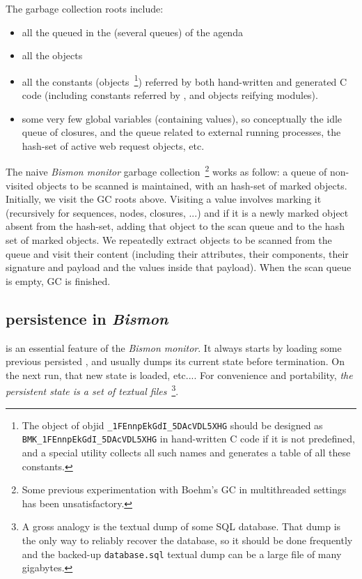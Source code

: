 The garbage collection roots include:

\begin{itemize}
\item all the  queued in the (several queues) of the agenda
\item all the  objects
  \item all the constants (objects~\footnote{The object of objid
    \texttt{\_1FEnnpEkGdI\_5DAcVDL5XHG} should be designed as
    \texttt{BMK\_1FEnnpEkGdI\_5DAcVDL5XHG} in hand-written C code if
    it is not predefined, and a special utility collects all such
    names and generates a table of all these constants.}) referred by
    both hand-written and generated C code (including constants
    referred by , and objects reifying
    modules).
\item some very few global variables (containing values), so
  conceptually the idle queue of closures, and the queue related to
  external running processes, the hash-set of active web request
  objects, etc.
\end{itemize}

The naive \emph{Bismon monitor} garbage collection~\footnote{Some
  previous experimentation with Boehm's GC in multithreaded settings
  has been unsatisfactory.}  works as follow: a queue of non-visited
objects to be scanned is maintained, with an hash-set of marked
objects. Initially, we visit the GC roots above. Visiting a value
involves marking it (recursively for sequences, nodes, closures, ...)
and if it is a newly marked object absent from the hash-set, adding
that object to the scan queue and to the hash set of marked
objects. We repeatedly extract objects to be scanned from the queue
and visit their content (including their attributes, their components,
their signature and payload and the values inside that payload). When
the scan queue is empty, GC is finished.

\subsection{persistence in \emph{Bismon}}
\label{subsec:persistence}

 is an essential feature of the
\emph{Bismon monitor}.  It always starts by loading some
previous persisted , and usually dumps
 its current state before termination. On the next run,
that new state is loaded, etc....  For convenience and portability,
\emph{the persistent state is a set of textual files}~\footnote{A
  gross analogy is the textual dump of some SQL database. That dump is
  the only way to reliably recover the database, so it should be done
  frequently and the backed-up \texttt{database.sql} textual dump can
  be a large file of many gigabytes.}.

